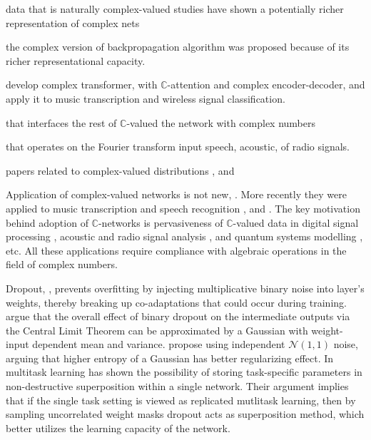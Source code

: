 \documentclass[a4paper,10pt]{article}
\newcommand{\cplx}{\mathbb{C}}
\begin{document}
\citep{yang_complex_2019,monning_evaluation_2018}

data that is naturally complex-valued
studies have shown a potentially richer representation of complex nets
\citep{hirose2003,fijulamin2009}

the complex version of backpropagation algorithm  was proposed because of
its richer representational capacity.

\citep{yang_complex_2019} develop complex transformer, with $\cplx$-attention and complex
encoder-decoder, and apply it to music transcription and wireless signal classification.

that interfaces the rest of
$\cplx$-valued
the network with complex numbers

that operates on the Fourier transform input speech, acoustic, of radio signals.

papers related to complex-valued distributions \citep{pav_moments_2015,taubock_complex-valued_2012},
and \citep{karseras_caution:_2014}

Application of complex-valued networks is not new, \citep{citation_needed}. More recently
they were applied to music transcription and speech recognition \citep{trabelsi_deep_2017},
and \citep{yang_complex_2019}. The key motivation behind adoption of $\cplx$-networks is
pervasiveness of $\cplx$-valued data in digital signal processing \citep{citation_needed},
acoustic and radio signal analysis \citep{citation_needed}, and quantum systems modelling
\citep{citation_needed}, etc. All these applications require compliance with algebraic
operations in the field of complex numbers.

Dropout, \citep{hinton_improving_2012}, prevents overfitting by injecting multiplicative
binary noise into layer's weights, thereby breaking up co-adaptations that could occur
during training. \citet{wang_fast_2013} argue that the overall effect of binary dropout
on the intermediate outputs via the Central Limit Theorem can be approximated by a Gaussian
with weight-input dependent mean and variance. \citet{srivastava_dropout_2014} propose
using independent $\mathcal{N}(1,1)$ noise, arguing that higher entropy of a Gaussian has
better regularizing effect. In multitask learning \citet{cheung_superposition_2019}
has shown the possibility of storing task-specific parameters in non-destructive superposition
within a single network. Their argument implies that if the single task setting is viewed
as replicated mutlitask learning, then by sampling uncorrelated weight masks dropout acts
as superposition method, which better utilizes the learning capacity of the network.
\end{document}
